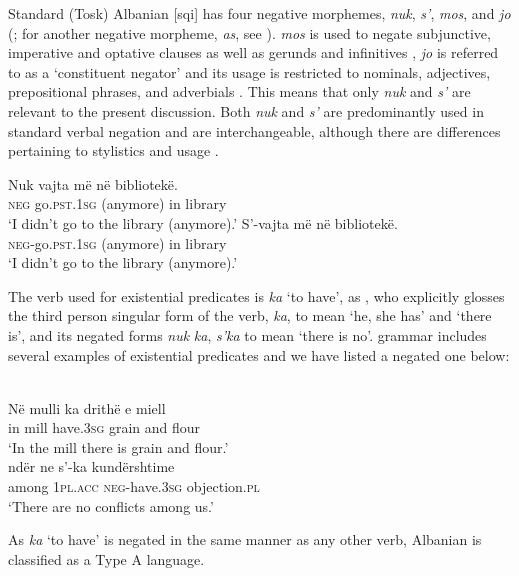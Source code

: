 \documentclass[output=paper]{langsci/langscibook}
\begin{document}
Standard (Tosk) Albanian [sqi] has four negative morphemes,
\textit{nuk}, \textit{s’}, \textit{mos}, and \textit{jo}
(\citealt[82]{Turano2000}; for another negative morpheme, \textit{as}, see
\citealt[172]{BuchholzFiedler1987}). \textit{mos} is used to negate
subjunctive, imperative and optative clauses as well as gerunds and
infinitives \citep[85]{Turano2000}, \textit{jo} is referred to as a
`constituent negator' and its usage is restricted to nominals, adjectives,
prepositional phrases, and adverbials \citep[86]{Turano2000}. This means
that only \textit{nuk} and \textit{s’} are relevant to the present
discussion. Both \textit{nuk} and \textit{s’} are predominantly used in
standard verbal negation and are interchangeable, although there are
differences pertaining to stylistics and usage \parencite[172]{BuchholzFiedler1987}. 
%
\begin{exe}\ex
{}
\begin{xlist}
\ex
    \gll Nuk vajta {\op}më{\cp} në bibliotekë.  \\
\textsc{neg}  go.\textsc{pst.1sg} (anymore) in  library \\
    \glt `I didn't go to the library (anymore).' 
\ex
\gll S’-vajta {\op}më{\cp} në bibliotekë.\\
\textsc{neg}-go.\textsc{pst}.\textsc{1sg}  (anymore) in library\\
\glt `I didn't go to the library (anymore).' 
\end{xlist}\end{exe}
%
The verb used for existential predicates is \textit{ka} `to have', as \citet[12]{Camaj1984}, who explicitly glosses the third person singular form of the verb, \textit{ka}, to mean `he, she has' and `there is', and its negated forms \textit{nuk} \textit{ka}, \textit{s’ka} to mean `there is no'.  grammar includes several examples of existential predicates and we have listed a negated one below:
%
\begin{exe}\ex
{}\\
    \gll Në  mulli ka drithë e miell \\
in mill have.\textsc{3sg} grain and flour \\
    \glt
`In the mill there is grain and flour.' 
\ex
{}\\
    \gll ndër ne s’-ka kundërshtime \\
among \textsc{1pl}.\textsc{acc}  \textsc{neg}-have.\textsc{3sg} objection.\textsc{pl} \\
    \glt `There are no conflicts among us.' 
    \end{exe}
%
As \textit{ka} `to have' is negated in the same manner as any other verb,
Albanian is classified as a Type A language. 
\end{document}
